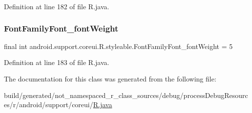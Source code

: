 Definition at line 182 of file R.\+java.

\mbox{\label{classandroid_1_1support_1_1coreui_1_1_r_1_1styleable_ab902fae1b15d37a55f927de5a8914a7e}} 
\subsubsection{\texorpdfstring{FontFamilyFont\_fontWeight}{FontFamilyFont\_fontWeight}}
{\footnotesize\ttfamily final int android.\+support.\+coreui.\+R.\+styleable.\+Font\+Family\+Font\+\_\+font\+Weight = 5\hspace{0.3cm}{\ttfamily [static]}}



Definition at line 183 of file R.\+java.



The documentation for this class was generated from the following file\+:\begin{DoxyCompactItemize}
\item 
build/generated/not\+\_\+namespaced\+\_\+r\+\_\+class\+\_\+sources/debug/process\+Debug\+Resources/r/android/support/coreui/\mbox{\hyperlink{android_2support_2coreui_2_r_8java}{R.\+java}}\end{DoxyCompactItemize}
